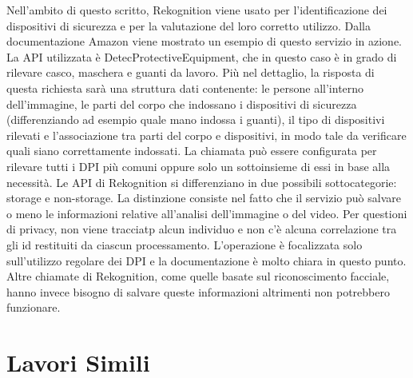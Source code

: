\noindent Nell'ambito di questo scritto, Rekognition viene usato per l'identificazione dei dispositivi di sicurezza e per la valutazione del loro corretto utilizzo. Dalla documentazione Amazon viene mostrato un esempio di questo servizio in azione. La API utilizzata è DetecProtectiveEquipment, che in questo caso è in grado di rilevare casco, maschera e guanti da lavoro. Più nel dettaglio, la risposta di questa richiesta sarà una struttura dati contenente: le persone all'interno dell'immagine, le parti del corpo che indossano i dispositivi di sicurezza (differenziando ad esempio quale mano indossa i guanti), il tipo di dispositivi rilevati e l'associazione tra parti del corpo e dispositivi, in modo tale da verificare quali siano correttamente indossati. La chiamata può essere configurata per rilevare tutti i DPI più comuni oppure solo un sottoinsieme di essi in base alla necessità. Le API di Rekognition si differenziano in due possibili sottocategorie: storage e non-storage. La distinzione consiste nel fatto che il servizio può salvare o meno le informazioni relative all'analisi dell'immagine o del video. Per questioni di privacy, non viene tracciatp alcun individuo e non c'è alcuna correlazione tra gli id restituiti da ciascun processamento. L'operazione è focalizzata solo sull'utilizzo regolare dei DPI e la documentazione è molto chiara in questo punto. Altre chiamate di Rekognition, come quelle basate sul riconoscimento facciale, hanno invece bisogno di salvare queste informazioni altrimenti non potrebbero funzionare.

\section{Lavori Simili}